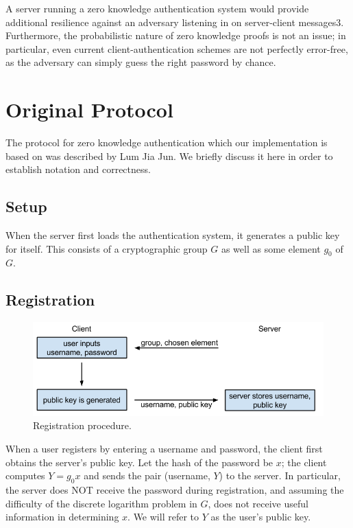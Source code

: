 \documentclass[11pt]{article}
\begin{document}
A server running a zero knowledge authentication system would provide additional resilience against an adversary listening in on server-client messages3.  Furthermore, the probabilistic nature of zero knowledge proofs is not an issue; in particular, even current client-authentication schemes are not perfectly error-free, as the adversary can simply guess the right password by chance.

\section{Original Protocol}

The protocol for zero knowledge authentication which our implementation is based on was described by Lum Jia Jun.  We briefly discuss it here in order to establish notation and correctness.

\subsection{Setup}

When the server first loads the authentication system, it generates a public key for itself.  This consists of a cryptographic group $G$ as well as some element $g_0$ of $G$.

\subsection{Registration}

\begin{figure}[h]
  \centering
\includegraphics[scale=0.65]{currentauth.png}

 \caption{Registration procedure.}
 \label{fig:registration}
\end{figure}
When a user registers by entering a username and password, the client first obtains the server’s public key.  Let the hash of the password be $x$; the client computes $Y = g_0x$ and sends the pair (username, $Y$) to the server.  In particular, the server does NOT receive the password during registration, and assuming the difficulty of the discrete logarithm problem in $G$, does not receive useful information in determining $x$.  We will refer to $Y$ as the user’s public key.
\end{document}
